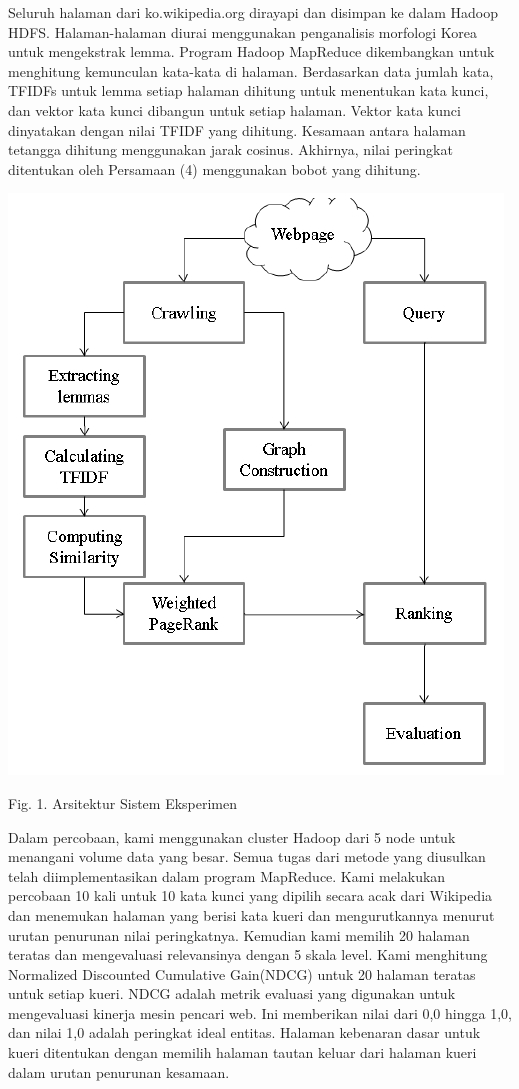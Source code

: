 \documentclass[conference]{IEEEtran}
\begin{document}
Seluruh halaman dari ko.wikipedia.org dirayapi dan disimpan ke dalam Hadoop HDFS.
Halaman-halaman diurai menggunakan penganalisis morfologi Korea untuk mengekstrak lemma. Program Hadoop MapReduce dikembangkan untuk menghitung kemunculan kata-kata di halaman. Berdasarkan data jumlah kata, TFIDFs untuk lemma setiap halaman dihitung untuk menentukan kata kunci, dan vektor kata kunci dibangun untuk setiap halaman.
Vektor kata kunci dinyatakan dengan nilai TFIDF yang dihitung. Kesamaan antara halaman tetangga dihitung menggunakan jarak cosinus. Akhirnya, nilai peringkat ditentukan oleh Persamaan (4) menggunakan bobot yang dihitung.
\begin{center}
    \includegraphics[scale=0.5]{chart}

Fig. 1. Arsitektur Sistem Eksperimen
\end{center}

Dalam percobaan, kami menggunakan cluster Hadoop dari 5 node untuk menangani volume data yang besar. Semua tugas dari metode yang diusulkan telah diimplementasikan dalam program MapReduce.
Kami melakukan percobaan 10 kali untuk 10 kata kunci yang dipilih secara acak dari Wikipedia dan menemukan halaman yang berisi kata kueri dan mengurutkannya menurut urutan penurunan nilai peringkatnya. Kemudian kami memilih 20 halaman teratas dan mengevaluasi relevansinya dengan 5 skala level.
Kami menghitung Normalized Discounted Cumulative Gain(NDCG)\cite{resnik1999semantic} untuk 20 halaman teratas untuk setiap kueri. NDCG adalah metrik evaluasi yang digunakan untuk mengevaluasi kinerja mesin pencari web. Ini memberikan nilai dari 0,0 hingga 1,0, dan nilai 1,0 adalah peringkat ideal entitas.
Halaman kebenaran dasar untuk kueri ditentukan dengan memilih halaman tautan keluar dari halaman kueri dalam urutan penurunan kesamaan.
\end{document}
